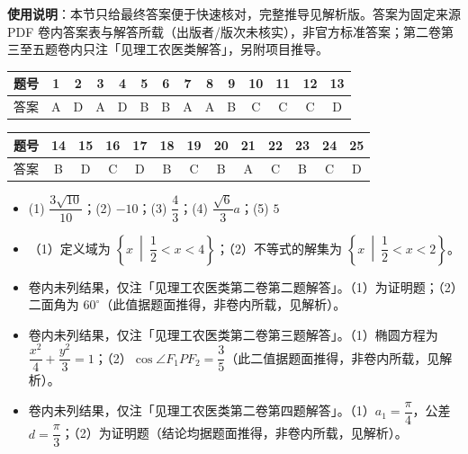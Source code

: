 
\begin{gknotice}
\textbf{使用说明}：本节只给最终答案便于快速核对，完整推导见解析版。答案为固定来源 PDF 卷内答案表与解答所载（出版者/版次未核实），非官方标准答案；第二卷第三至五题卷内只注「见理工农医类解答」，另附项目推导。
\end{gknotice}

\begin{center}\begin{tabular}{cccccccccccccc}
\toprule
题号 & 1 & 2 & 3 & 4 & 5 & 6 & 7 & 8 & 9 & 10 & 11 & 12 & 13 \\
\midrule
答案 & A & D & A & D & B & B & A & A & B & C & C & C & D \\
\bottomrule
\end{tabular}\end{center}\medskip
\begin{center}\begin{tabular}{ccccccccccccc}
\toprule
题号 & 14 & 15 & 16 & 17 & 18 & 19 & 20 & 21 & 22 & 23 & 24 & 25 \\
\midrule
答案 & B & D & C & D & B & C & B & A & C & B & C & D \\
\bottomrule
\end{tabular}\end{center}

\begin{itemize}[leftmargin=2.6em]
  \item[\textbf{26.}] (1) $\dfrac{3\sqrt{10}}{10}$；(2) $-10$；(3) $\dfrac43$；(4) $\dfrac{\sqrt6}{3}a$；(5) $5$
\end{itemize}

\begin{itemize}[leftmargin=2.6em]
  \item[\textbf{27.}] （1）定义域为 $\left\{x\ \middle|\ \dfrac12<x<4\right\}$；（2）不等式的解集为 $\left\{x\ \middle|\ \dfrac12<x<2\right\}$。
  \item[\textbf{28.}] 卷内未列结果，仅注「见理工农医类第二卷第二题解答」。（1）为证明题；（2）二面角为 $60^\circ$（此值据题面推得，非卷内所载，见解析）。
  \item[\textbf{29.}] 卷内未列结果，仅注「见理工农医类第二卷第三题解答」。（1）椭圆方程为 $\dfrac{x^2}{4}+\dfrac{y^2}{3}=1$；（2）$\cos\angle F_1PF_2=\dfrac35$（此二值据题面推得，非卷内所载，见解析）。
  \item[\textbf{30.}] 卷内未列结果，仅注「见理工农医类第二卷第四题解答」。（1）$a_1=\dfrac{\pi}{4}$，公差 $d=\dfrac{\pi}{3}$；（2）为证明题（结论均据题面推得，非卷内所载，见解析）。
\end{itemize}

